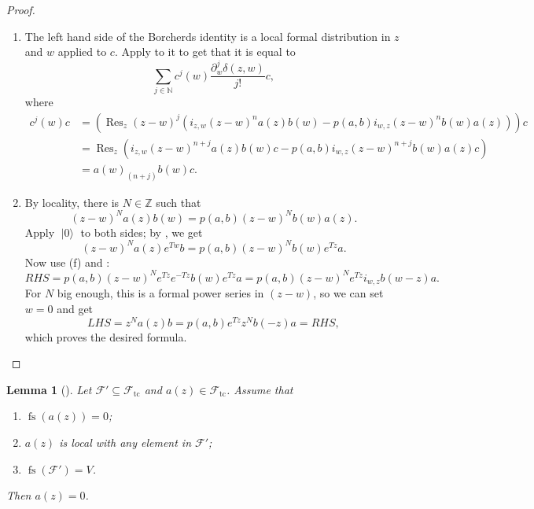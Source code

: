 \documentclass[a4paper, 12pt, reqno]{amsart}
\newtheorem{lemma}[theorem]{Lemma}
\theoremstyle{remark}
\numberwithin{equation}{subsection}
\DeclareMathOperator{\Res}{Res}
\DeclareMathOperator{\vac}{|0\rangle}
\DeclareMathOperator{\fs}{fs}
\DeclareMathOperator{\tc}{tc}
\begin{document}
\begin{proof}
\begin{enumerate}
  \item The left hand side of the Borcherds identity is a local formal distribution in $z$ and $w$ applied to $c$.
    Apply  to it to get that it is equal to
    \begin{equation*}
      \sum_{j \in \mathbb{N}} c^j(w)\frac{\partial^j_w\delta(z,w)}{j!}c,
    \end{equation*}
    where
    \begin{align*}
      c^j(w)c &= (\Res_z(z - w)^j(i_{z, w}(z - w)^na(z)b(w) - p(a, b)i_{w, z}(z - w)^nb(w)a(z)))c \\
      &= \Res_z(i_{z, w}(z - w)^{n + j}a(z)b(w)c - p(a, b)i_{w, z}(z - w)^{n + j}b(w)a(z)c) \\
      &= a(w)_{(n + j)}b(w)c.
    \end{align*}
  \item By locality, there is $N \in \mathbb{Z}$ such that
    \begin{equation*}
      (z - w)^Na(z)b(w) = p(a, b)(z - w)^Nb(w)a(z).
    \end{equation*}
    Apply $\vac$ to both sides; by , we get
    \begin{equation*}
      (z - w)^Na(z)e^{Tw}b = p(a, b)(z - w)^Nb(w)e^{Tz}a.
    \end{equation*}
    Now use (f) and :
    \begin{equation*}
      RHS = p(a, b)(z - w)^Ne^{Tz}e^{-Tz}b(w)e^{Tz}a = p(a, b)(z - w)^Ne^{Tz}i_{w, z}b(w - z)a.
    \end{equation*}
    For $N$ big enough, this is a formal power series in $(z - w)$, so we can set $w = 0$ and get
    \begin{equation*}
      LHS = z^Na(z)b = p(a, b)e^{Tz}z^Nb(-z)a = RHS,
    \end{equation*}
    which proves the desired formula. \qedhere
  \end{enumerate}
\end{proof}

\begin{lemma}[{\cite[Lemma 3]{callegaro_introduction_2017}}]
  \label{lmm:7}
  Let $\mathcal{F}' \subseteq \mathcal{F}_{\tc}$ and $a(z) \in \mathcal{F}_{\tc}$.
  Assume that
  \begin{enumerate}
  \item $\fs(a(z)) = 0$;
  \item $a(z)$ is local with any element in $\mathcal{F}'$;
  \item $\fs(\mathcal{F}') = V$.
  \end{enumerate}
  Then $a(z) = 0$.
\end{lemma}
\end{document}
